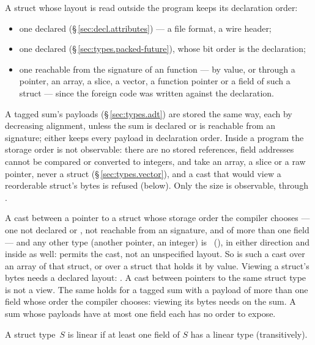 \pnum
A struct whose layout is read outside the program keeps its declaration order:
\begin{itemize}
  \item one declared \tok{[ordered]} (\S\,\ref{sec:decl.attributes}) --- a file format, a wire
        header;
  \item one declared \tok{[packed]} (\S\,\ref{sec:types.packed-future}), whose bit order is the
        declaration;
  \item one reachable from the signature of an  function --- by value, or through a
        pointer, an array, a slice, a vector, a function pointer or a field of such a struct ---
        since the foreign code was written against the declaration.
\end{itemize}
A tagged sum's payloads (\S\,\ref{sec:types.adt}) are stored the same way, each by decreasing
alignment, unless the sum is declared \tok{[ordered]} or is reachable from an 
signature; either keeps every payload in declaration order.
Inside a program the storage order is not observable: there are no stored references, field
addresses cannot be compared or converted to integers,  and  take
an array, a slice or a raw pointer, never a struct (\S\,\ref{sec:types.vector}), and a cast that
would view a reorderable struct's bytes is refused (below). Only the size is observable, through
.

\begin{constraint}
  A cast between a pointer to a struct whose storage order the compiler chooses --- one not
  declared \tok{[ordered]} or \tok{[packed]}, not reachable from an  signature, and
  of more than one field --- and any other type (another pointer, an integer) is
  \illformed{}~(), in either direction and inside  as well:
   permits the cast, not an unspecified layout. So is such a cast over an array of
  that struct, or over a struct that holds it by value. Viewing a struct's bytes needs a declared
  layout: \tok{[ordered]}. A cast between pointers to the same struct type is not a view.
  The same holds for a tagged sum with a payload of more than one field whose order the
  compiler chooses: viewing its bytes needs \tok{[ordered]} on the sum. A sum whose payloads
  have at most one field each has no order to expose.
\end{constraint}

\pnum
A struct type~$S$ is linear if at least one field of $S$ has a linear type
(transitively).

